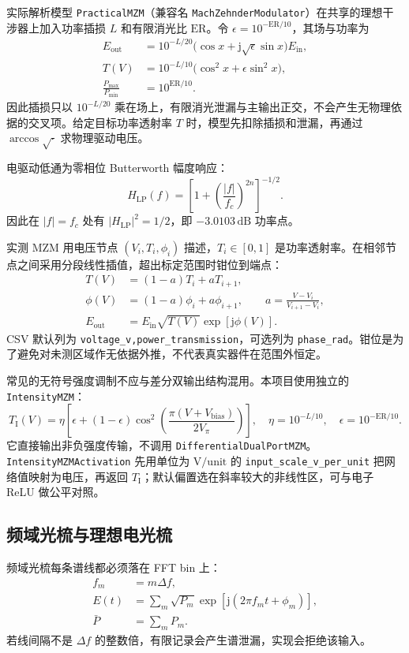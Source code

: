 \documentclass[11pt,a4paper,UTF8]{ctexart}
\newcommand{\pkg}[1]{\texttt{#1}}
\begin{document}
实际解析模型 \pkg{PracticalMZM}（兼容名 \pkg{MachZehnderModulator}）在共享的理想干涉器上加入功率插损 $L$ 和有限消光比 $\mathrm{ER}$。令 $\epsilon=10^{-\mathrm{ER}/10}$，其场与功率为
\begin{align}
E_{\mathrm{out}}&=10^{-L/20}\bigl(\cos x+\mathrm{j}\sqrt{\epsilon}\sin x\bigr)E_{\mathrm{in}},\\
T(V)&=10^{-L/10}\bigl(\cos^2x+\epsilon\sin^2x\bigr),\\
\frac{P_{\max}}{P_{\min}}&=10^{\mathrm{ER}/10}.
\end{align}
因此插损只以 $10^{-L/20}$ 乘在场上，有限消光泄漏与主输出正交，不会产生无物理依据的交叉项。给定目标功率透射率 $T$ 时，模型先扣除插损和泄漏，再通过 $\arccos\sqrt{\cdot}$ 求物理驱动电压。

电驱动低通为零相位 Butterworth 幅度响应：
\begin{equation}
H_{\mathrm{LP}}(f)=\left[1+\left(\frac{|f|}{f_c}\right)^{2n}\right]^{-1/2}.
\end{equation}
因此在 $|f|=f_c$ 处有 $|H_{\mathrm{LP}}|^2=1/2$，即 $-3.0103\,\mathrm{dB}$ 功率点。

实测 MZM 用电压节点 $(V_i,T_i,\phi_i)$ 描述，$T_i\in[0,1]$ 是功率透射率。在相邻节点之间采用分段线性插值，超出标定范围时钳位到端点：
\begin{align}
T(V)&=(1-a)T_i+aT_{i+1},\\
\phi(V)&=(1-a)\phi_i+a\phi_{i+1},\qquad
a=\frac{V-V_i}{V_{i+1}-V_i},\\
E_{\mathrm{out}}&=E_{\mathrm{in}}\sqrt{T(V)}\exp[\mathrm{j}\phi(V)].
\end{align}
CSV 默认列为 \pkg{voltage\_v,power\_transmission}，可选列为 \pkg{phase\_rad}。钳位是为了避免对未测区域作无依据外推，不代表真实器件在范围外恒定。

常见的无符号强度调制不应与差分双输出结构混用。本项目使用独立的 \pkg{IntensityMZM}：
\begin{equation}
T_{\mathrm I}(V)=\eta\left[\epsilon+(1-\epsilon)
\cos^2\!\left(\frac{\pi(V+V_{\mathrm{bias}})}{2V_\pi}\right)\right],
\quad \eta=10^{-L/10},\quad \epsilon=10^{-\mathrm{ER}/10}.
\end{equation}
它直接输出非负强度传输，不调用 \pkg{DifferentialDualPortMZM}。\pkg{IntensityMZMActivation} 先用单位为 $\mathrm{V/unit}$ 的 \pkg{input\_scale\_v\_per\_unit} 把网络值映射为电压，再返回 $T_{\mathrm I}$；默认偏置选在斜率较大的非线性区，可与电子 ReLU 做公平对照。

\subsection{频域光梳与理想电光梳}
频域光梳每条谱线都必须落在 FFT bin 上：
\begin{align}
f_m &= m\Delta f,\\
E(t)&=\sum_m\sqrt{P_m}\exp\!\left[\mathrm{j}(2\pi f_mt+\phi_m)\right],\\
\bar P&=\sum_mP_m.
\end{align}
若线间隔不是 $\Delta f$ 的整数倍，有限记录会产生谱泄漏，实现会拒绝该输入。
\end{document}
